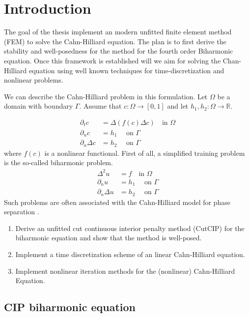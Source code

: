 \section{Introduction}\label{sec:introduction}
The goal of the thesis implement an modern unfitted finite element method (FEM) to solve the Cahn-Hilliard equation. The plan is to first derive the stability and well-posedness for the method for the fourth order Biharmonic equation. Once this framework is established will we aim for solving the Chan-Hilliard equation using well known techniques for time-discretization and nonlinear problems.

We can describe the Cahn-Hilliard problem in this formulation. Let $\Omega  $ be a domain with boundary $\Gamma $. Assume that $c: \Omega  \to \left[ 0,1 \right] $ and let $h_{1},h_{2}:\Omega  \to \mathbb{R} $.

\[
    \begin{split}
\partial _{t} c &= \Delta ( f(c) \Delta c)     \quad  \text{in } \Omega \\
\partial _{n} c & = h_{1} \quad \text{ on } \Gamma  \\
\partial _{n} \Delta c  & = h_{2} \quad \text{ on } \Gamma
    \end{split}
\]
where $f( c) $ is a nonlinear functional. First of all, a simplified training problem is the so-called biharmonic problem.
\[
    \begin{split}
\Delta ^2 u & = f \quad  \text{in } \Omega \\
\partial _{n} u & = h_{1} \quad \text{ on } \Gamma  \\
\partial _{n} \Delta u  & = h_{2} \quad \text{ on } \Gamma
    \end{split}
\]
Such problems are often associated with the Cahn-Hilliard model
for phase separation \cite{cahnhilliard1957} .



\begin{enumerate}[label=(\alph*)]
    \item Derive an unfitted cut continuous interior penalty method (CutCIP) for the biharmonic equation and show that the method is well-posed.
    \item Implement a time discretization scheme of an linear Cahn-Hilliard equation.
    \item Implement nonlinear iteration methods for the (nonlinear) Cahn-Hilliard Equation.
\end{enumerate}



\subsection{CIP biharmonic equation}%
\label{sub:cip_biharmonic_equation}


